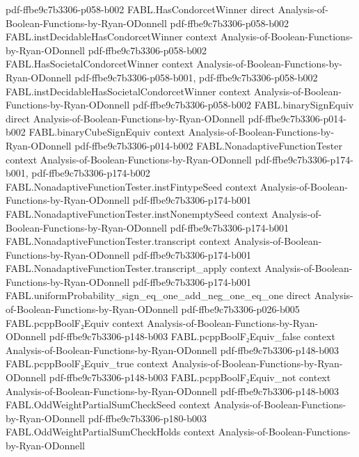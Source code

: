 \begin{theorem}
  {pdf-ffbe9c7b3306-p058-b002}
\proofstep
  {FABL.HasCondorcetWinner}
  {direct}
  {Analysis-of-Boolean-Functions-by-Ryan-ODonnell}
  {pdf-ffbe9c7b3306-p058-b002}
\proofstep
  {FABL.instDecidableHasCondorcetWinner}
  {context}
  {Analysis-of-Boolean-Functions-by-Ryan-ODonnell}
  {pdf-ffbe9c7b3306-p058-b002}
\proofstep
  {FABL.HasSocietalCondorcetWinner}
  {context}
  {Analysis-of-Boolean-Functions-by-Ryan-ODonnell}
  {pdf-ffbe9c7b3306-p058-b001,
    pdf-ffbe9c7b3306-p058-b002}
\proofstep
  {FABL.instDecidableHasSocietalCondorcetWinner}
  {context}
  {Analysis-of-Boolean-Functions-by-Ryan-ODonnell}
  {pdf-ffbe9c7b3306-p058-b002}
\proofstep
  {FABL.binarySignEquiv}
  {direct}
  {Analysis-of-Boolean-Functions-by-Ryan-ODonnell}
  {pdf-ffbe9c7b3306-p014-b002}
\proofstep
  {FABL.binaryCubeSignEquiv}
  {context}
  {Analysis-of-Boolean-Functions-by-Ryan-ODonnell}
  {pdf-ffbe9c7b3306-p014-b002}
\proofstep
  {FABL.NonadaptiveFunctionTester}
  {context}
  {Analysis-of-Boolean-Functions-by-Ryan-ODonnell}
  {pdf-ffbe9c7b3306-p174-b001,
    pdf-ffbe9c7b3306-p174-b002}
\proofstep
  {FABL.NonadaptiveFunctionTester.instFintypeSeed}
  {context}
  {Analysis-of-Boolean-Functions-by-Ryan-ODonnell}
  {pdf-ffbe9c7b3306-p174-b001}
\proofstep
  {FABL.NonadaptiveFunctionTester.instNonemptySeed}
  {context}
  {Analysis-of-Boolean-Functions-by-Ryan-ODonnell}
  {pdf-ffbe9c7b3306-p174-b001}
\proofstep
  {FABL.NonadaptiveFunctionTester.transcript}
  {context}
  {Analysis-of-Boolean-Functions-by-Ryan-ODonnell}
  {pdf-ffbe9c7b3306-p174-b001}
\proofstep
  {FABL.NonadaptiveFunctionTester.transcript_apply}
  {context}
  {Analysis-of-Boolean-Functions-by-Ryan-ODonnell}
  {pdf-ffbe9c7b3306-p174-b001}
\proofstep
  {FABL.uniformProbability_sign_eq_one_add_neg_one_eq_one}
  {direct}
  {Analysis-of-Boolean-Functions-by-Ryan-ODonnell}
  {pdf-ffbe9c7b3306-p026-b005}
\proofstep
  {FABL.pcppBoolF₂Equiv}
  {context}
  {Analysis-of-Boolean-Functions-by-Ryan-ODonnell}
  {pdf-ffbe9c7b3306-p148-b003}
\proofstep
  {FABL.pcppBoolF₂Equiv_false}
  {context}
  {Analysis-of-Boolean-Functions-by-Ryan-ODonnell}
  {pdf-ffbe9c7b3306-p148-b003}
\proofstep
  {FABL.pcppBoolF₂Equiv_true}
  {context}
  {Analysis-of-Boolean-Functions-by-Ryan-ODonnell}
  {pdf-ffbe9c7b3306-p148-b003}
\proofstep
  {FABL.pcppBoolF₂Equiv_not}
  {context}
  {Analysis-of-Boolean-Functions-by-Ryan-ODonnell}
  {pdf-ffbe9c7b3306-p148-b003}
\proofstep
  {FABL.OddWeightPartialSumCheckSeed}
  {context}
  {Analysis-of-Boolean-Functions-by-Ryan-ODonnell}
  {pdf-ffbe9c7b3306-p180-b003}
\proofstep
  {FABL.OddWeightPartialSumCheckHolds}
  {context}
  {Analysis-of-Boolean-Functions-by-Ryan-ODonnell}

\end{theorem}
